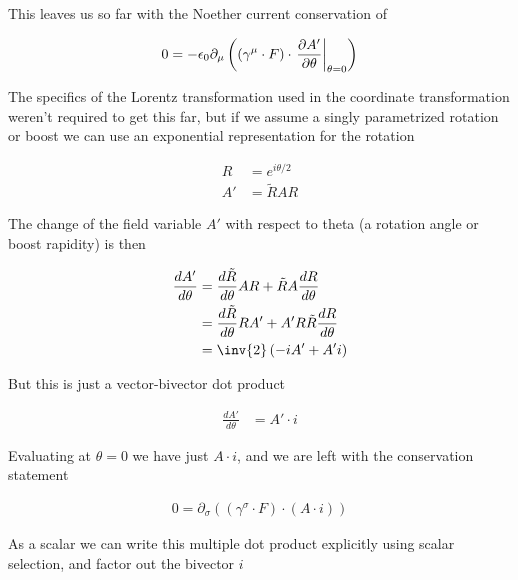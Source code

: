
This leaves us so far with the Noether current conservation of

\begin{align}\label{eqn:rotationCurrents:goo6}
0 = -\epsilon_0 \partial_\mu \left( (\gamma^\mu \cdot F) \cdot {\left. \frac{\partial {A'}}{\partial {\theta}} \right\vert}_{\theta=0}  \right)
\end{align}

The specifics of the Lorentz transformation used in the coordinate transformation weren't required to get this far, but if we assume a singly parametrized rotation or boost we can use an exponential representation for the rotation

\begin{align}\label{eqn:rotationCurrents:goo7}
R &= e^{i\theta/2} \\
A' &= \tilde{R} A R
\end{align}

The change of the field variable $A'$ with respect to theta (a rotation angle or boost rapidity) is then

\begin{align*}
\frac{dA'}{d\theta}
&= \frac{d\tilde{R}}{d\theta} A R + \tilde{R} A \frac{d R}{d\theta} \\
&= \frac{d\tilde{R}}{d\theta} R A' + A' R \tilde{R} \frac{d R}{d\theta} \\
&= \inv{2} \left( -i A' + A' i \right) \\
\end{align*}

But this is just a vector-bivector dot product

\begin{align}\label{eqn:rotationCurrents:goo8}
\frac{dA'}{d\theta} &= A' \cdot i
\end{align}

Evaluating at $\theta = 0$ we have just $A \cdot i$, and we are left with the conservation statement

\begin{align}\label{eqn:rotationCurrents:goo9}
0 = \partial_\sigma \left( (\gamma^\sigma \cdot F) \cdot (A \cdot i) \right)
\end{align}

As a scalar we can write this multiple dot product explicitly using scalar selection, and factor out the bivector $i$

